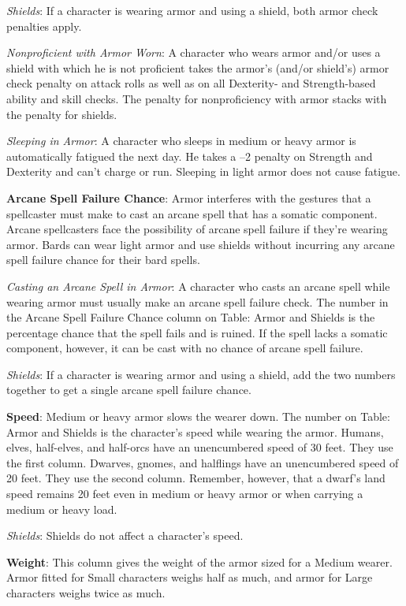\textit{Shields}: If a character is wearing armor and using a shield, both armor check penalties apply.
	
\textit{Nonproficient with Armor Worn}: A character who wears armor and/or uses a shield with which he is not proficient takes the armor's (and/or shield's) armor check penalty on attack rolls as well as on all Dexterity- and Strength-based ability and skill checks. The penalty for nonproficiency with armor stacks with the penalty for shields.
	
\textit{Sleeping in Armor}: A character who sleeps in medium or heavy armor is automatically fatigued the next day. He takes a --2 penalty on Strength and Dexterity and can't charge or run. Sleeping in light armor does not cause fatigue.
	
\textbf{Arcane Spell Failure Chance}: Armor interferes with the gestures that a spellcaster must make to cast an arcane spell that has a somatic component. Arcane spellcasters face the possibility of arcane spell failure if they're wearing armor. Bards can wear light armor and use shields without incurring any arcane spell failure chance for their bard spells.
	
\textit{Casting an Arcane Spell in Armor}: A character who casts an arcane spell while wearing armor must usually make an arcane spell failure check. The number in the Arcane Spell Failure Chance column on Table: Armor and Shields is the percentage chance that the spell fails and is ruined. If the spell lacks a somatic component, however, it can be cast with no chance of arcane spell failure.
	
\textit{Shields}: If a character is wearing armor and using a shield, add the two numbers together to get a single arcane spell failure chance.
	
\textbf{Speed}: Medium or heavy armor slows the wearer down. The number on Table: Armor and Shields is the character's speed while wearing the armor. Humans, elves, half-elves, and half-orcs have an unencumbered speed of 30 feet. They use the first column. Dwarves, gnomes, and halflings have an unencumbered speed of 20 feet. They use the second column. Remember, however, that a dwarf's land speed remains 20 feet even in medium or heavy armor or when carrying a medium or heavy load.
	
\textit{Shields}: Shields do not affect a character's speed.
	
\textbf{Weight}: This column gives the weight of the armor sized for a Medium wearer. Armor fitted for Small characters weighs half as much, and armor for Large characters weighs twice as much.
	
